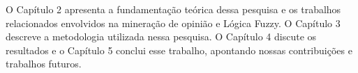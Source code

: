 \documentclass[template.tex]{subfiles}
\begin{document}

O Capítulo 2 apresenta a fundamentação teórica dessa pesquisa e os trabalhos relacionados envolvidos na mineração de opinião e Lógica Fuzzy. O Capítulo 3 descreve a metodologia utilizada nessa pesquisa. O Capítulo 4 discute os resultados e o Capítulo 5 conclui esse trabalho, apontando nossas contribuições e trabalhos futuros.


\end{document}
